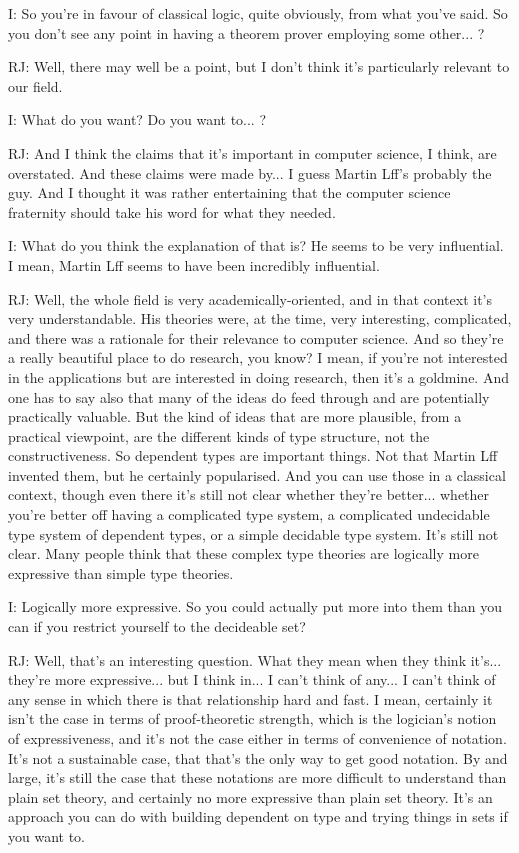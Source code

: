 \documentclass[10pt,titlepage]{book}
\begin{document}
I: So you're in favour of classical logic, quite obviously, from what you've said. So you don't see any point in having a theorem prover employing some other... ?

RJ: Well, there may well be a point, but I don't think it's particularly relevant to our field.

I: What do you want? Do you want to... ?

RJ: And I think the claims that it's important in computer science, I think, are overstated. And these claims were made by... I guess Martin Lff's probably the guy. And I thought it was rather entertaining that the computer science fraternity should take his word for what they needed.

I: What do you think the explanation of that is? He seems to be very influential. I mean, Martin Lff seems to have been incredibly influential.

RJ: Well, the whole field is very academically-oriented, and in that context it's very understandable. His theories were, at the time, very interesting, complicated, and there was a rationale for their relevance to computer science. And so they're a really beautiful place to do research, you know? I mean, if you're not interested in the applications but are interested in doing research, then it's a goldmine. And one has to say also that many of the ideas do feed through and are potentially practically valuable. But the kind of ideas that are more plausible, from a practical viewpoint, are the different kinds of type structure, not the constructiveness. So dependent types are important things. Not that Martin Lff invented them, but he certainly popularised. And you can use those in a classical context, though even there it's still not clear whether they're better... whether you're better off having a complicated type system, a complicated undecidable type system of dependent types, or a simple decidable type system. It's still not clear. Many people think that these complex type theories are logically more expressive than simple type theories.

I: Logically more expressive. So you could actually put more into them than you can if you restrict yourself to the decideable set?

RJ: Well, that's an interesting question. What they mean when they think it's... they're more expressive... but I think in... I can't think of any... I can't think of any sense in which there is that relationship hard and fast. I mean, certainly it isn't the case in terms of proof-theoretic strength, which is the logician's notion of expressiveness, and it's not the case either in terms of convenience of notation. It's not a sustainable case, that that's the only way to get good notation. By and large, it's still the case that these notations are more difficult to understand than plain set theory, and certainly no more expressive than plain set theory. It's an approach you can do with building			dependent on type and trying things in sets if you want to.
\end{document}
